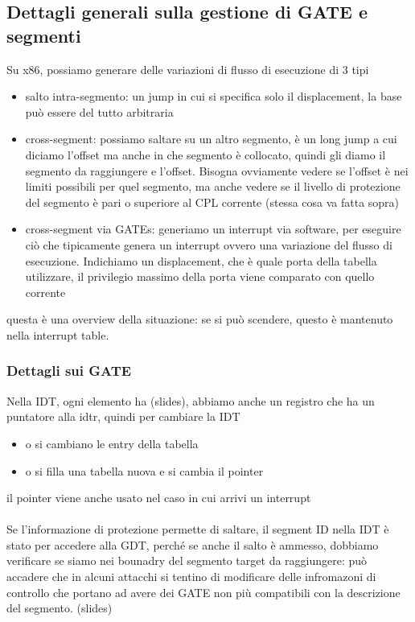 \documentclass[12pt, oneside]{extbook}
\begin{document}
\subsection{Dettagli generali sulla gestione di GATE e segmenti}
Su x86, possiamo generare delle variazioni di flusso di esecuzione di 3 tipi
\begin{itemize}
\item salto intra-segmento: un jump  in cui si specifica solo il displacement, la base può essere del tutto arbitraria
\item cross-segment: possiamo saltare su un altro segmento, è un long jump a cui diciamo l'offset ma anche in che segmento è collocato, quindi gli diamo il segmento da raggiungere e l'offset. Bisogna ovviamente vedere se l'offset è nei limiti possibili per quel segmento, ma anche vedere se il livello di protezione del segmento è pari o superiore al CPL corrente (stessa cosa va fatta sopra)
\item cross-segment via GATEs: generiamo un interrupt via software, per eseguire ciò che tipicamente genera un interrupt ovvero una variazione del flusso di esecuzione. Indichiamo un displacement, che è quale porta della tabella utilizzare, il privilegio massimo della porta viene comparato con quello corrente
\end{itemize}
questa è una overview della situazione:
se si può scendere, questo è mantenuto nella interrupt table.
\subsubsection{Dettagli sui GATE}
Nella IDT, ogni elemento ha (slides), abbiamo anche un registro che ha un puntatore alla idtr, quindi per cambiare la IDT 
\begin{itemize}
\item o si cambiano le entry della tabella
\item o si filla una tabella nuova e si cambia il pointer
\end{itemize}
il pointer viene anche usato nel caso in cui arrivi un interrupt\\\\ Se l'informazione di protezione permette di saltare, il segment ID nella IDT è stato per accedere alla GDT, perché se anche il salto è ammesso, dobbiamo verificare se siamo nei bounadry del segmento target da raggiungere: può accadere che in alcuni attacchi si tentino di modificare delle infromazoni di controllo che portano ad avere dei GATE non più compatibili con la descrizione del segmento. (slides)
\end{document}
